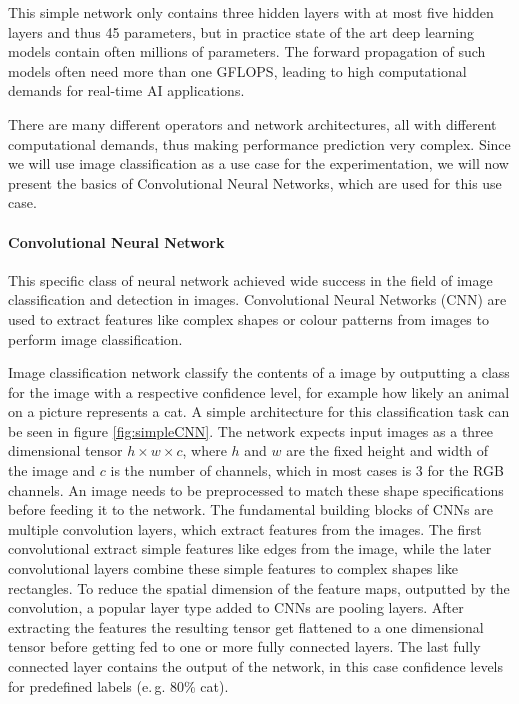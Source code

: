 This simple network only contains three hidden layers with at most five hidden layers and thus 45 parameters, but in practice state of the art deep learning models contain often millions of parameters. 
The forward propagation of such models often need more than one GFLOPS, leading to high computational demands for real-time AI applications.


There are many different operators and network architectures, all with different computational demands, thus making performance prediction very complex.
Since we will use image classification as a use case for the experimentation, we will now present the basics of Convolutional Neural Networks, which are used for this use case.

\paragraph{Convolutional Neural Network}
This specific class of neural network achieved wide success in the field of image classification and detection in images. Convolutional Neural Networks (CNN) are used to extract features like complex shapes or colour patterns from images to perform image classification. 

Image classification network classify the contents of a image by outputting a class for the image with a respective confidence level, for example how likely an animal on a picture represents a cat.
A simple architecture for this classification task can be seen in figure \ref{fig:simpleCNN}.
The network expects input images as a three dimensional tensor $h\times w\times c$, where $h$ and $w$ are the fixed height and width of the image and $c$ is the number of channels, which in most cases is $3$ for the RGB channels.
An image needs to be preprocessed to match these shape specifications before feeding it to the network.
The fundamental building blocks of CNNs are multiple convolution layers, which extract features from the images. The first convolutional extract simple features like edges from the image, while the later convolutional layers combine these simple features to complex shapes like rectangles.
To reduce the spatial dimension of the feature maps, outputted by the convolution, a popular layer type added to CNNs are pooling layers.
After extracting the features the resulting tensor get flattened to a one dimensional tensor before getting fed to one or more fully connected layers.
The last fully connected layer contains the output of the network, in this case confidence levels for predefined labels (e.\,g. $80$\% cat).  


